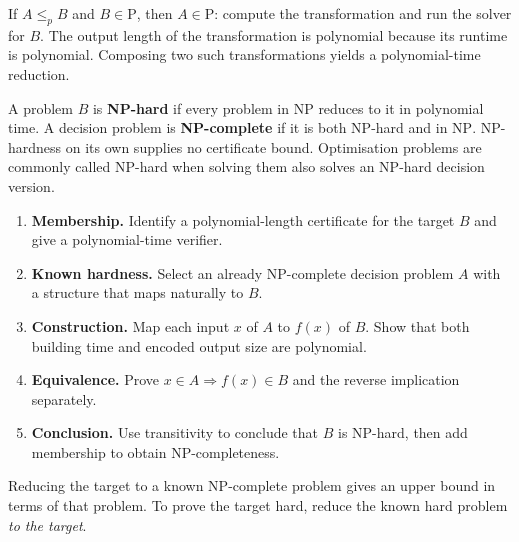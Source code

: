 \documentclass[12pt,a4paper]{article}
\begin{document}
\begin{tcolorbox}[tikzbox, title={Direction of a polynomial-time reduction}]
\centering
{}\par
\end{tcolorbox}

If $A\le_p B$ and $B\in\mathrm P$, then $A\in\mathrm P$: compute the transformation and run the solver for $B$. The output length of the transformation is polynomial because its runtime is polynomial. Composing two such transformations yields a polynomial-time reduction.
\begin{tcolorbox}[defbox, title={NP-hard and NP-complete}]
A problem $B$ is \textbf{NP-hard} if every problem in $\mathrm{NP}$ reduces to it in polynomial time. A decision problem is \textbf{NP-complete} if it is both NP-hard and in $\mathrm{NP}$. NP-hardness on its own supplies no certificate bound. Optimisation problems are commonly called NP-hard when solving them also solves an NP-hard decision version.
\end{tcolorbox}

\begin{enumerate}[leftmargin=*, itemsep=3pt, topsep=4pt]
  \item \textbf{Membership.} Identify a polynomial-length certificate for the target $B$ and give a polynomial-time verifier.
  \item \textbf{Known hardness.} Select an already NP-complete decision problem $A$ with a structure that maps naturally to $B$.
  \item \textbf{Construction.} Map each input $x$ of $A$ to $f(x)$ of $B$. Show that both building time and encoded output size are polynomial.
  \item \textbf{Equivalence.} Prove $x\in A\Rightarrow f(x)\in B$ and the reverse implication separately.
  \item \textbf{Conclusion.} Use transitivity to conclude that $B$ is NP-hard, then add membership to obtain NP-completeness.
\end{enumerate}
\begin{tcolorbox}[masonbox, title={Check the reduction direction}]
Reducing the target to a known NP-complete problem gives an upper bound in terms of that problem. To prove the target hard, reduce the known hard problem \emph{to the target}.
\end{tcolorbox}
\end{document}
